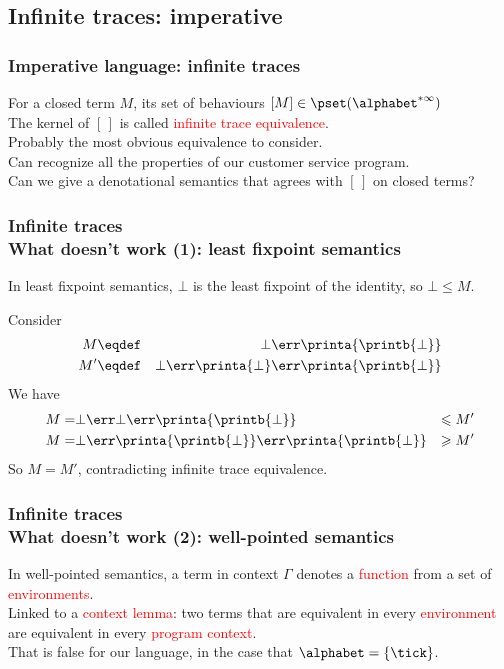 \documentclass{beamer}
\newcommand{\red}[1]{\textcolor{red}{#1}}
\begin{document}
\subsection{Infinite traces: imperative}

\begin{frame}\frametitle{Imperative language: infinite traces}

For a closed term $M$, its set of behaviours $[M] \in \pset(\alphabet^{*\infty})$ \\
\medskip \pause
The kernel of $[\,]$ is called \red{infinite trace equivalence}. \\
\medskip \pause
Probably the most obvious equivalence to consider. \\

\medskip \pause
Can recognize all the properties of our customer service program. \\

\medskip \pause
Can we give a denotational semantics that agrees with $[\,]$ on closed terms?




  
\end{frame}


\begin{frame}\frametitle{Infinite traces \\ What doesn't work (1): least fixpoint semantics}

In least fixpoint semantics, $\bot$ is the least fixpoint of the identity, so $\bot \leqslant M$.  \\
\medskip

Consider
\begin{eqnarray*}
  M & \eqdef & \bot \err \printa{\printb{\bot}} \\
  M' & \eqdef & \bot \err \printa{\bot} \err \printa{\printb{\bot}}
\end{eqnarray*}
We have
\begin{eqnarray*}
  M = & \bot \err \bot \err \printa{\printb{\bot}} & \leqslant M' \\
 M = & \bot \err \printa{\printb{\bot}} \err \printa{\printb{\bot}} & \geqslant M'
\end{eqnarray*}
So $M=M'$, contradicting infinite trace equivalence.
  
\end{frame}

\begin{frame}\frametitle{Infinite traces \\ What doesn't work (2): well-pointed semantics}
  
In well-pointed semantics, a term in context $\Gamma$ denotes a \red{function} from a set of \red{environments}. \\
\medskip 
Linked to a \red{context lemma}: two terms that are equivalent in every \red{environment} are
    equivalent in every \red{program context}.   \\
\medskip
That is false for our language, in the case that $\alphabet = \{\tick\}$. 


\end{frame}
\end{document}
